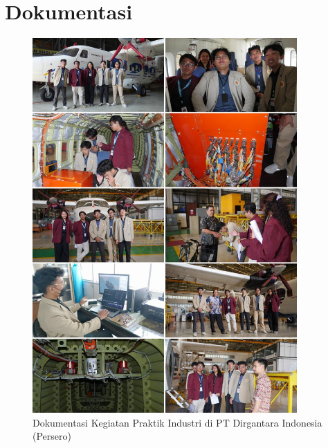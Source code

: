 \section{Dokumentasi}
\begin{figure}[H]
	\centering\includegraphics[width = 0.9\textwidth]{gambar/dokumentasi.jpeg}
	\caption{Dokumentasi Kegiatan Praktik Industri di PT Dirgantara Indonesia (Persero)}
\end{figure}




